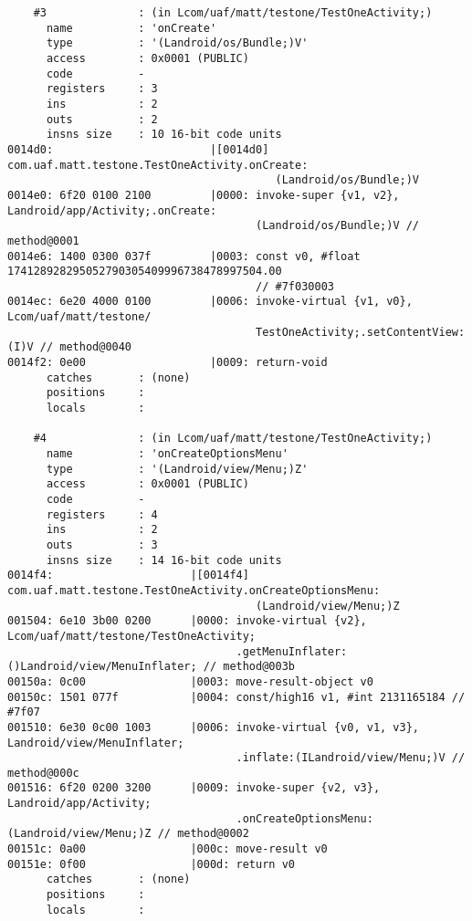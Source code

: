 \begin{lstlisting}
    #3              : (in Lcom/uaf/matt/testone/TestOneActivity;)
      name          : 'onCreate'
      type          : '(Landroid/os/Bundle;)V'
      access        : 0x0001 (PUBLIC)
      code          -
      registers     : 3
      ins           : 2
      outs          : 2
      insns size    : 10 16-bit code units
0014d0:                        |[0014d0] com.uaf.matt.testone.TestOneActivity.onCreate:
                                         (Landroid/os/Bundle;)V
0014e0: 6f20 0100 2100         |0000: invoke-super {v1, v2}, Landroid/app/Activity;.onCreate:
                                      (Landroid/os/Bundle;)V // method@0001
0014e6: 1400 0300 037f         |0003: const v0, #float 174128928295052790305409996738478997504.00
                                      // #7f030003
0014ec: 6e20 4000 0100         |0006: invoke-virtual {v1, v0}, Lcom/uaf/matt/testone/
                                      TestOneActivity;.setContentView:(I)V // method@0040
0014f2: 0e00                   |0009: return-void
      catches       : (none)
      positions     :
      locals        :

    #4              : (in Lcom/uaf/matt/testone/TestOneActivity;)
      name          : 'onCreateOptionsMenu'
      type          : '(Landroid/view/Menu;)Z'
      access        : 0x0001 (PUBLIC)
      code          -
      registers     : 4
      ins           : 2
      outs          : 3
      insns size    : 14 16-bit code units
0014f4:                     |[0014f4] com.uaf.matt.testone.TestOneActivity.onCreateOptionsMenu:
                                      (Landroid/view/Menu;)Z
001504: 6e10 3b00 0200      |0000: invoke-virtual {v2}, Lcom/uaf/matt/testone/TestOneActivity;
                                   .getMenuInflater:()Landroid/view/MenuInflater; // method@003b
00150a: 0c00                |0003: move-result-object v0
00150c: 1501 077f           |0004: const/high16 v1, #int 2131165184 // #7f07
001510: 6e30 0c00 1003      |0006: invoke-virtual {v0, v1, v3}, Landroid/view/MenuInflater;
                                   .inflate:(ILandroid/view/Menu;)V // method@000c
001516: 6f20 0200 3200      |0009: invoke-super {v2, v3}, Landroid/app/Activity;
                                   .onCreateOptionsMenu:(Landroid/view/Menu;)Z // method@0002
00151c: 0a00                |000c: move-result v0
00151e: 0f00                |000d: return v0
      catches       : (none)
      positions     :
      locals        :


\end{lstlisting}
